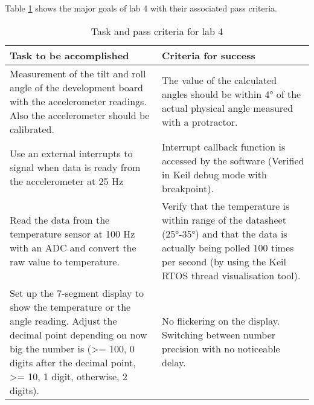 \documentclass[12pt]{article}
\begin{document}
Table \ref{Table_tasks} shows the major goals of lab 4 with their associated pass criteria.
\begin{table}[!h]
\centering
\caption{Task and pass criteria for lab 4}
\label{Table_tasks}
\begin{tabular}{|p{0.5\linewidth}|p{0.5\linewidth}|}
\hline
\textbf{Task to be accomplished}                                                                                                                                                                                                              & \textbf{Criteria for success}                                                                                                                                                                                            \\ \hline
Measurement of the tilt and roll angle of the development board with the accelerometer readings. Also the accelerometer should be calibrated.                                                                                                 & The value of the calculated angles should be within 4° of the actual physical angle measured with a protractor.                                                                                                          \\ \hline
Use an external interrupts to signal when data is ready from the accelerometer at 25 Hz                                                                                                                                                       & Interrupt callback function is accessed by the software (Verified in Keil debug mode with breakpoint).                                                                                                                   \\ \hline
Read the data from the temperature sensor at 100 Hz with an ADC and convert the raw value to temperature.                                                                                                                                     & Verify that the temperature is within range of the datasheet (25°-35°) and that the data is actually being polled 100 times per second (by using the Keil RTOS thread visualisation tool).                               \\ \hline
Set up the 7-segment display to show the temperature or the angle reading. Adjust the decimal point depending on now big the number is (\textgreater= 100, 0 digits after the decimal point, \textgreater= 10, 1 digit, otherwise, 2 digits). & No flickering on the display. Switching between number precision with no noticeable delay.                                                                                                                               \\ \hline

\end{tabular}
\end{table}
\end{document}
